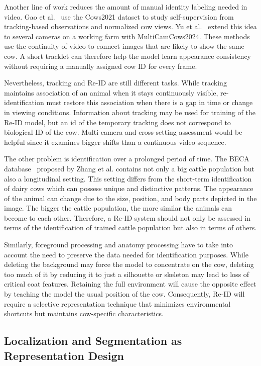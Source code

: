 Another line of work reduces the amount of manual identity labeling needed in video. Gao et al.~\cite{gao2021cows2021} use the Cows2021 dataset to study self-supervision from tracking-based observations and normalized cow views. Yu et al.~\cite{yu2025multicam} extend this idea to several cameras on a working farm with MultiCamCows2024. These methods use the continuity of video to connect images that are likely to show the same cow. A short tracklet can therefore help the model learn appearance consistency without requiring a manually assigned cow ID for every frame.

Nevertheless, tracking and Re-ID are still different tasks. While tracking maintains association of an animal when it stays continuously visible, re-identification must restore this association when there is a gap in time or change in viewing conditions. Information about tracking may be used for training of the Re-ID model, but an id of the temporary tracking does not correspond to biological ID of the cow. Multi-camera and cross-setting assessment would be helpful since it examines bigger shifts than a continuous video sequence.

The other problem is identification over a prolonged period of time. The BECA database~\cite{zhang2026beca} proposed by Zhang et al. contains not only a big cattle population but also a longitudinal setting. This setting differs from the short-term identification of dairy cows which can possess unique and distinctive patterns. The appearance of the animal can change due to the size, position, and body parts depicted in the image. The bigger the cattle population, the more similar the animals can become to each other. Therefore, a Re-ID system should not only be assessed in terms of the identification of trained cattle population but also in terms of others.

Similarly, foreground processing and anatomy processing have to take into account the need to preserve the data needed for identification purposes. While deleting the background may force the model to concentrate on the cow, deleting too much of it by reducing it to just a silhouette or skeleton may lead to loss of critical coat features. Retaining the full environment will cause the opposite effect by teaching the model the usual position of the cow. Consequently, Re-ID will require a selective representation technique that minimizes environmental shortcuts but maintains cow-specific characteristics.

\subsection{Localization and Segmentation as Representation Design}

